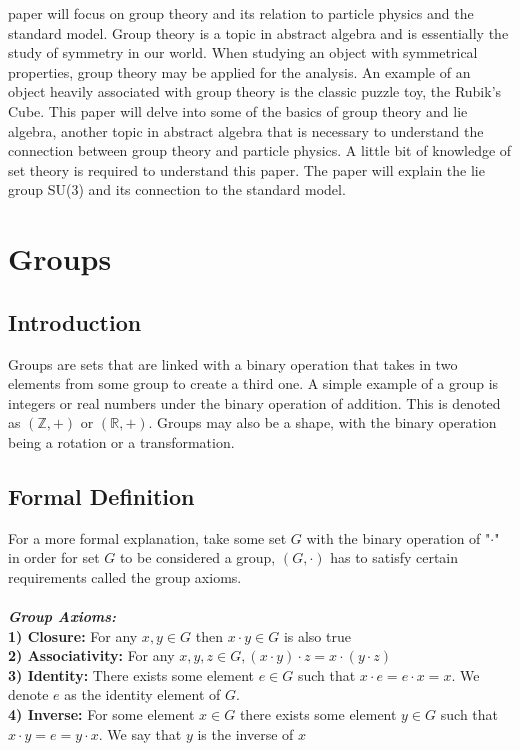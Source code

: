 \documentclass[12pt,journal,compsoc]{IEEEtran}
\newcommand{\Z}{\mathbb{Z}}
\newcommand{\R}{\mathbb{R}}
\begin{document}
 paper will focus on group theory and its relation to particle physics and the standard model. Group theory is a topic in abstract algebra and is essentially the study of symmetry in our world. When studying an object with symmetrical properties, group theory may be applied for the analysis. An example of an object heavily associated with group theory is the classic puzzle toy, the Rubik’s Cube. This paper will delve into some of the basics of group theory and lie algebra, another topic in abstract algebra that is necessary to understand the connection between group theory and particle physics. A little bit of knowledge of set theory is required to understand this paper. The paper will explain the lie group SU(3) and its connection to the standard model.

\section{Groups}
\subsection{Introduction}
Groups are sets that are linked with a binary operation that takes in two elements from some group to create a third one. A simple example of a group is integers or real numbers under the binary operation of addition. This is denoted as $(\Z, +)$ or $(\R,+)$. Groups may also be a shape, with the binary operation being a rotation or a transformation.
\subsection{Formal Definition}
For a more formal explanation, take some set $G$ with the binary operation of "$\cdot$" in order for set $G$ to be considered a group, $(G, \cdot)$ has to satisfy certain requirements called the group axioms.\\\\
\textit{\textbf{Group Axioms:}} \\
\textbf{1) Closure: } For any $x, y \in G$ then $x \cdot y \in G$ is also true \\
\textbf{2) Associativity: }For any $x, y, z \in G, (x \cdot y) \cdot z = x \cdot (y \cdot z)$ \\
\textbf{3) Identity: } There exists some element $e \in G$ such that $x \cdot e = e \cdot x = x$. We denote $e$ as the identity element of $G$.\\
\textbf{4) Inverse: } For some element $x \in G$ there exists some element $y \in G$ such that $x \cdot y = e = y \cdot x$. We say that $y$ is the inverse of $x$
\end{document}
